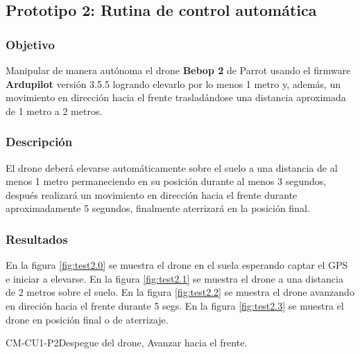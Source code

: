 \subsection{Prototipo 2: Rutina de control automática}

\subsubsection{Objetivo}
Manipular de manera autónoma el drone \textbf{Bebop 2} de Parrot usando el firmware \textbf{Ardupilot} versión 3.5.5 logrando elevarlo por lo menos 1 metro y, además, un movimiento en dirección hacia el frente trasladándose una distancia aproximada de 1 metro a 2 metros.

\subsubsection{Descripción}
El drone deberá elevarse automáticamente sobre el suelo a una distancia de al menos 1 metro permaneciendo en su posición durante al menos 3 segundos, después realizará un movimiento en dirección hacia el frente durante aproximadamente 5 segundos, finalmente aterrizará en la posición final.

\subsubsection{Resultados}

En la figura \ref{fig:test2.0} se muestra el drone en el suela esperando captar el GPS e iniciar a elevarse.
En la figura \ref{fig:test2.1} se muestra el drone a una distancia de 2 metros sobre el suelo.
En la figura \ref{fig:test2.2} se muestra el drone avanzando en direción hacia el frente durante 5 segs.
En la figura \ref{fig:test2.3} se muestra el drone en posición final o de aterrizaje.


\begin{prueba}{CM-CU1-P2}{Despegue del drone, Avanzar hacia el frente.}
\end{prueba}
